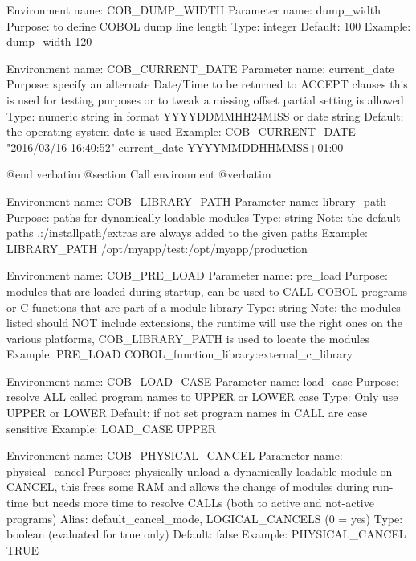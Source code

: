 Environment name:  COB_DUMP_WIDTH
  Parameter name:  dump_width
         Purpose:  to define COBOL dump line length
            Type:  integer
         Default:  100
         Example:  dump_width 120

Environment name:  COB_CURRENT_DATE
  Parameter name:  current_date
         Purpose:  specify an alternate Date/Time to be returned to ACCEPT
                   clauses this is used for testing purposes or to tweak
                   a missing offset partial setting is allowed
            Type:  numeric string in format YYYYDDMMHH24MISS or date string
         Default:  the operating system date is used
         Example:  COB_CURRENT_DATE "2016/03/16 16:40:52"
                   current_date YYYYMMDDHHMMSS+01:00


@end verbatim
@section Call environment
@verbatim


Environment name:  COB_LIBRARY_PATH
  Parameter name:  library_path
         Purpose:  paths for dynamically-loadable modules
            Type:  string
            Note:  the default paths .:/installpath/extras are always
                   added to the given paths
         Example:  LIBRARY_PATH    /opt/myapp/test:/opt/myapp/production

Environment name:  COB_PRE_LOAD
  Parameter name:  pre_load
         Purpose:  modules that are loaded during startup, can be used
                   to CALL COBOL programs or C functions that are part
                   of a module library
            Type:  string
            Note:  the modules listed should NOT include extensions, the
                   runtime will use the right ones on the various platforms,
                   COB_LIBRARY_PATH is used to locate the modules
         Example:  PRE_LOAD      COBOL_function_library:external_c_library

Environment name:  COB_LOAD_CASE
  Parameter name:  load_case
         Purpose:  resolve ALL called program names to UPPER or LOWER case
            Type:  Only use  UPPER  or  LOWER
         Default:  if not set program names in CALL are case sensitive
         Example:  LOAD_CASE  UPPER

Environment name:  COB_PHYSICAL_CANCEL
  Parameter name:  physical_cancel
         Purpose:  physically unload a dynamically-loadable module on CANCEL,
                   this frees some RAM and allows the change of modules during
                   run-time but needs more time to resolve CALLs (both to
                   active and not-active programs)
           Alias:  default_cancel_mode, LOGICAL_CANCELS (0 = yes)
            Type:  boolean (evaluated for true only)
         Default:  false
         Example:  PHYSICAL_CANCEL  TRUE


